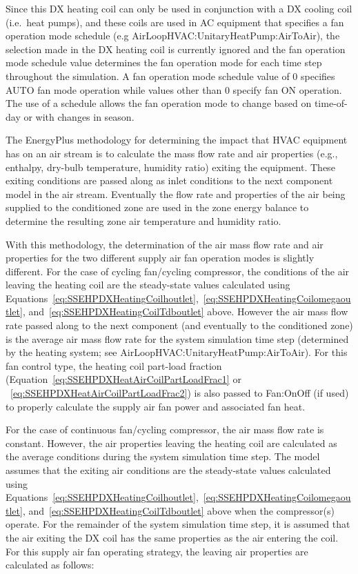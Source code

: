Since this DX heating coil can only be used in conjunction with a DX cooling coil (i.e.~heat pumps), and these coils are used in AC equipment that specifies a fan operation mode schedule (e.g AirLoopHVAC:UnitaryHeatPump:AirToAir), the selection made in the DX heating coil is currently ignored and the fan operation mode schedule value determines the fan operation mode for each time step throughout the simulation. A fan operation mode schedule value of 0 specifies AUTO fan mode operation while values other than 0 specify fan ON operation. The use of a schedule allows the fan operation mode to change based on time-of-day or with changes in season.

The EnergyPlus methodology for determining the impact that HVAC equipment has on an air stream is to calculate the mass flow rate and air properties (e.g., enthalpy, dry-bulb temperature, humidity ratio) exiting the equipment. These exiting conditions are passed along as inlet conditions to the next component model in the air stream. Eventually the flow rate and properties of the air being supplied to the conditioned zone are used in the zone energy balance to determine the resulting zone air temperature and humidity ratio.

With this methodology, the determination of the air mass flow rate and air properties for the two different supply air fan operation modes is slightly different. For the case of cycling fan/cycling compressor, the conditions of the air leaving the heating coil are the steady-state values calculated using Equations~\ref{eq:SSEHPDXHeatingCoilhoutlet},~\ref{eq:SSEHPDXHeatingCoilomegaoutlet}, and~\ref{eq:SSEHPDXHeatingCoilTdboutlet} above. However the air mass flow rate passed along to the next component (and eventually to the conditioned zone) is the average air mass flow rate for the system simulation time step (determined by the heating system; see AirLoopHVAC:UnitaryHeatPump:AirToAir). For this fan control type, the heating coil part-load fraction (Equation~\ref{eq:SSEHPDXHeatAirCoilPartLoadFrac1} or ~\ref{eq:SSEHPDXHeatAirCoilPartLoadFrac2}) is also passed to Fan:OnOff (if used) to properly calculate the supply air fan power and associated fan heat.

For the case of continuous fan/cycling compressor, the air mass flow rate is constant. However, the air properties leaving the heating coil are calculated as the average conditions during the system simulation time step. The model assumes that the exiting air conditions are the steady-state values calculated using Equations~\ref{eq:SSEHPDXHeatingCoilhoutlet},~\ref{eq:SSEHPDXHeatingCoilomegaoutlet}, and~\ref{eq:SSEHPDXHeatingCoilTdboutlet} above when the compressor(s) operate. For the remainder of the system simulation time step, it is assumed that the air exiting the DX coil has the same properties as the air entering the coil. For this supply air fan operating strategy, the leaving air properties are calculated as follows:

